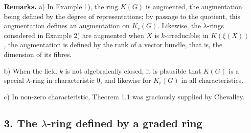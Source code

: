 \documentclass[11pt]{article}
\begin{document}
\textbf{Remarks.} a) In Example 1), the ring $K(G)$ is augmented, the augmentation being defined by the degree of representations; by passage to the quotient, this augmentation defines an augmentation on $K_r(G)$. Likewise, the $\lambda$-rings considered in Example 2) are augmented when $X$ is $k$-irreducible; in $K(\xi(X))$, the augmentation is defined by the rank of a vector bundle, that is, the dimension of its fibres.

b) When the field $k$ is not algebraically closed, it is plausible that $K(G)$ is a special $\lambda$-ring in characteristic $0$, and likewise for $K_r(G)$ in all characteristics.

c) In non-zero characteristic, Theorem 1.1 was graciously supplied by Chevalley.

\subsection*{3. The $\lambda$-ring defined by a graded ring}
\end{document}
